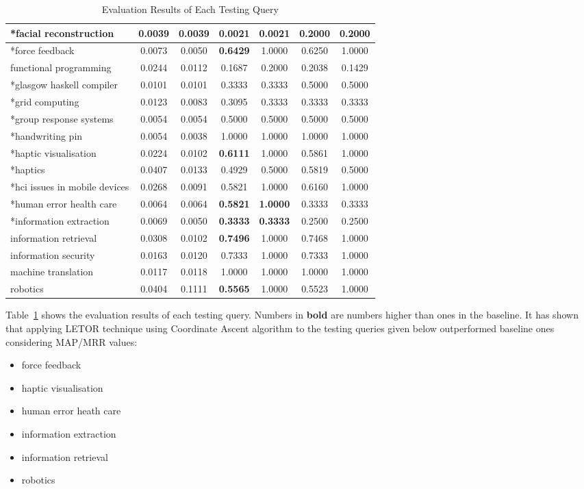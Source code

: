 \begin{table}
{\begin{tabular}{|l|c|c|c|c|c|c|}
\hline *facial reconstruction & 0.0039 & 0.0039 & 0.0021 & 0.0021 & 0.2000 & 0.2000 \\
\hline *force feedback & 0.0073 & 0.0050 & \textbf{0.6429} & 1.0000 & 0.6250 & 1.0000 \\
\hline functional programming & 0.0244 & 0.0112 & 0.1687 & 0.2000 & 0.2038 & 0.1429 \\
\hline *glasgow haskell compiler & 0.0101 & 0.0101 & 0.3333 & 0.3333 & 0.5000 & 0.5000 \\
\hline *grid computing & 0.0123 & 0.0083 & 0.3095 & 0.3333 & 0.3333 & 0.3333 \\
\hline *group response systems & 0.0054 & 0.0054 & 0.5000 & 0.5000 & 0.5000 & 0.5000 \\
\hline *handwriting pin & 0.0054 & 0.0038 & 1.0000 & 1.0000 & 1.0000 & 1.0000 \\
\hline *haptic visualisation & 0.0224 & 0.0102 & \textbf{0.6111} & 1.0000 & 0.5861 & 1.0000 \\
\hline *haptics & 0.0407 & 0.0133 & 0.4929 & 0.5000 & 0.5819 & 0.5000 \\
\hline *hci issues in mobile devices & 0.0268 & 0.0091 & 0.5821 & 1.0000 & 0.6160 & 1.0000 \\
\hline *human error health care & 0.0064 & 0.0064 & \textbf{0.5821} & \textbf{1.0000} & 0.3333 & 0.3333 \\
\hline *information extraction & 0.0069 & 0.0050 & \textbf{0.3333} & \textbf{0.3333} & 0.2500 & 0.2500 \\
\hline information retrieval & 0.0308 & 0.0102 & \textbf{0.7496} & 1.0000 & 0.7468 & 1.0000 \\
\hline information security & 0.0163 & 0.0120 & 0.7333 & 1.0000 & 0.7333 & 1.0000 \\
\hline machine translation & 0.0117 & 0.0118 & 1.0000 & 1.0000 & 1.0000 & 1.0000 \\
\hline robotics & 0.0404 & 0.1111 & \textbf{0.5565} & 1.0000 & 0.5523 & 1.0000\\
\hline

\end{tabular}
}
\caption{Evaluation Results of Each Testing Query} \label{table:eachqueryevaluationresult}
\end{table}

Table~\ref{table:eachqueryevaluationresult} shows the evaluation results of each testing query. Numbers in \textbf{bold}
are numbers higher than ones in the baseline. It has shown that applying LETOR technique using
Coordinate Ascent algorithm to the testing queries given below outperformed baseline ones considering MAP/MRR values:
\begin{itemize}
 \item force feedback
 \item haptic visualisation
 \item human error heath care
 \item information extraction
 \item information retrieval
 \item robotics
\end{itemize}

